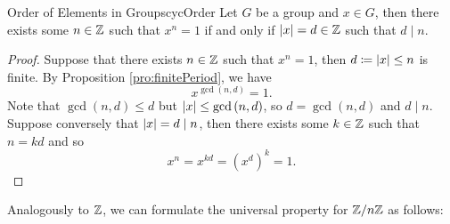 \documentclass[math]{amznotes}
\theoremstyle{remark}
\newcommand{\0}{\mathbf{0}}
\newcommand{\1}{\mathbf{1}}
\begin{document}
\begin{corbox}{Order of Elements in Groups}{cycOrder}
    Let $G$ be a group and $x \in G$, then there exists some $n \in \mathbb{Z}$ such that $x^n = 1$ if and only if ${\left\lvert {x} \right\rvert} = d \in \mathbb{Z}$ such that $d \mid n$.
    \tcblower
    \begin{proof}
        Suppose that there exists $n \in \mathbb{Z}$ such that $x^n = 1$, then $d \coloneqq {\left\lvert {x} \right\rvert} \leq n$ is finite. By Proposition \ref{pro:finitePeriod}, we have 
        \begin{equation*}
            x^{\gcd\left(n, d\right)} = 1.
        \end{equation*}
        Note that $\gcd\left(n, d\right) \leq d$ but ${\left\lvert {x} \right\rvert} \leq \gcd\left(n, d\right)$, so $d = \gcd\left(n, d\right)$ and $d \mid n$. Suppose conversely that ${\left\lvert {x} \right\rvert} = d \mid n$, then there exists some $k \in \mathbb{Z}$ such that $n = kd$ and so 
        \begin{equation*}
            x^n = x^{kd} = \left(x^d\right)^k = 1.
        \end{equation*}
    \end{proof}
\end{corbox}
Analogously to $\mathbb{Z}$, we can formulate the universal property for $\mathbb{Z} \slash n\mathbb{Z}$ as follows:
\end{document}
